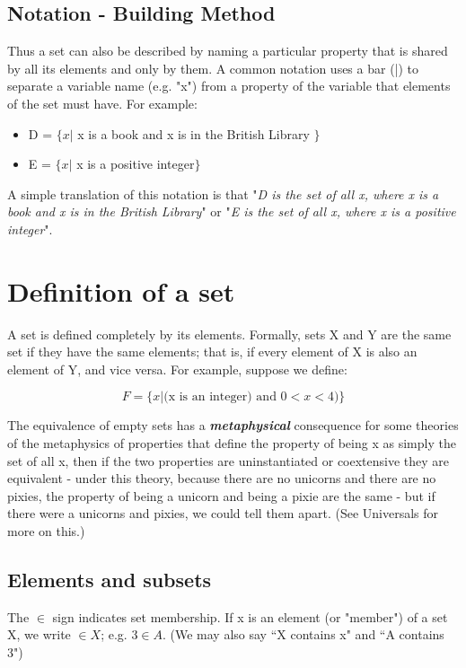 \documentclass[]{report}
\begin{document}
\subsection{Notation - Building Method}
Thus a set can also be described by naming a particular property that is shared by all its elements and only by them. A common notation uses a bar (|) to separate a variable name (e.g. "x") from a property of the variable that elements of the set must have. For example:
\begin{itemize}
	\item D = $\{x |$ x is a book and x is in the British Library $\}$
	\item E = $\{x |$ x is a positive integer$\}$
\end{itemize}
A simple translation of this notation is that "\textit{D is the set of all x, where x is a book and x is in the British Library}" or "\textit{E is the set of all x, where x is a positive integer}".

\section{Definition of a set}

A set is defined completely by its elements. Formally, sets X and Y are the same set if they have the same elements; that is, if every element of X is also an element of Y, and vice versa. For example, suppose we define:

\[ F = \{x | \mbox{(x is an integer)} \mbox{ and } 0 < x < 4)\}  \]

The equivalence of empty sets has a \textbf{\textit{metaphysical}} consequence for some theories of the metaphysics of properties that define the property of being x as simply the set of all x, then if the two properties are uninstantiated or coextensive they are equivalent - under this theory, because there are no unicorns and there are no pixies, the property of being a unicorn and being a pixie are the same - but if there were a unicorns and pixies, we could tell them apart. (See Universals for more on this.)

\subsection{Elements and subsets}

The $\in$  sign indicates set membership. If x is an element (or "member") of a set X, we write $ \in X$; e.g. $3\in A$. (We may also say ``X contains x" and ``A contains 3")
\end{document}

